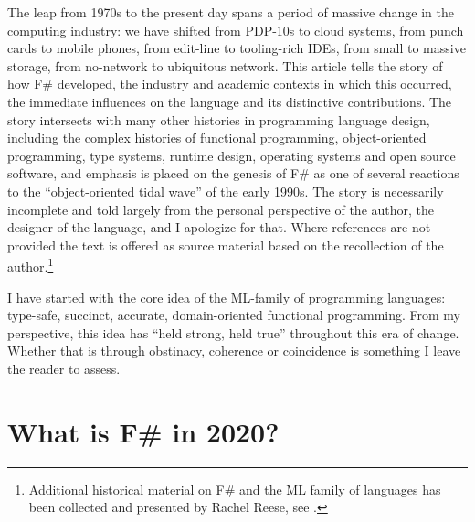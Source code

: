 \documentclass[acmsmall]{acmart}\settopmatter{}
\begin{document}
The leap from 1970s to the present day spans a period of massive change in the computing industry: we have shifted
from PDP-10s to cloud systems, from punch cards to mobile phones, from edit-line to tooling-rich IDEs, from small to
massive storage, from no-network to ubiquitous network. This article tells the story of how F\# developed, the
industry and academic contexts in which this occurred, the immediate influences on the language and its distinctive
contributions. The story intersects with many other histories in programming language design, including the complex
histories of functional programming, object-oriented programming, type systems, runtime design, operating systems and
open source software, and emphasis is placed on the genesis of F\# as one of several reactions to the ``object-oriented
tidal wave'' of the early 1990s.  The story is necessarily incomplete and told largely from the personal perspective of the
author, the designer of the language, and I apologize for that. Where references are not provided the text is offered
as source material based on the recollection of the author.\footnote{Additional historical material on F\# and the ML family of languages
has been collected and presented by Rachel Reese, see \citep{ReeseFSharpHistory}.}

I have started with the core idea of the ML-family of programming languages: type-safe, succinct, accurate,
domain-oriented functional programming. From my perspective, this idea has “held strong, held true” throughout this
era of change. Whether that is through obstinacy, coherence or coincidence is something I leave the reader to assess. 

\section*{What is F\# in 2020?}
\end{document}
